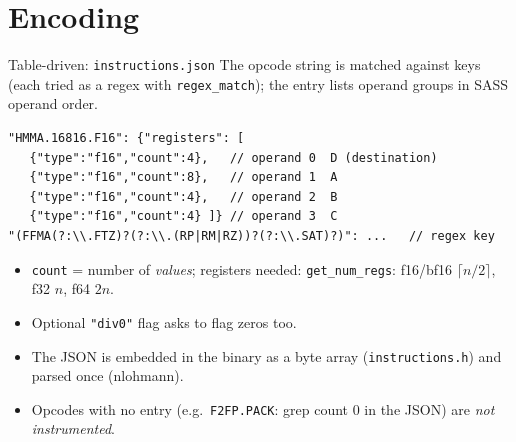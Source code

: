 \documentclass[aspectratio=169,10pt]{beamer}
\begin{document}
\section{Encoding}
\begin{frame}[fragile]{Table-driven: \texttt{instructions.json}}
\small The opcode string is matched against keys (each tried as a regex with \texttt{regex\_match}); the entry lists operand groups in SASS operand order.
\begin{lstlisting}
"HMMA.16816.F16": {"registers": [
   {"type":"f16","count":4},   // operand 0  D (destination)
   {"type":"f16","count":8},   // operand 1  A
   {"type":"f16","count":4},   // operand 2  B
   {"type":"f16","count":4} ]} // operand 3  C
"(FFMA(?:\\.FTZ)?(?:\\.(RP|RM|RZ))?(?:\\.SAT)?)": ...   // regex key
\end{lstlisting}
\begin{itemize}\small
\item \texttt{count} = number of \emph{values}; registers needed: \texttt{get\_num\_regs}: f16/bf16 $\lceil n/2\rceil$, f32 $n$, f64 $2n$.
\item Optional \texttt{"div0"} flag asks to flag zeros too.
\item The JSON is embedded in the binary as a byte array (\texttt{instructions.h}) and parsed once (nlohmann).
\item Opcodes with no entry (e.g.\ \texttt{F2FP.PACK}: grep count 0 in the JSON) are \emph{not instrumented}.
\end{itemize}
\end{frame}
\end{document}
